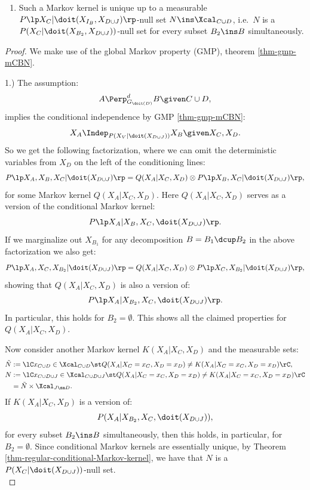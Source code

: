 \begin{Prp}
\begin{enumerate}
            that is a version of:  
            \[ P\lp X_A|\doit(X_{B_2}),X_C,\doit(X_{D\cup J})\rp\]
            for every subset $B_2 \ins B$ simultaneously. 
            Note that this Markov kernel is only dependent on $x_C$ and $x_D$, and constant in $x_{J \sm D}$.
        \item[] Such a Markov kernel is unique up to a measurable $P\lp X_C|\doit(X_{I_B},X_{D\cup J})\rp$-null set $N \ins \Xcal_{C\cup D}$, i.e.\ $N$ is a $P(X_C|\doit(X_{B_2},X_{D\cup J}))$-null set for every subset $B_2 \ins B$ simultaneously.
    \end{enumerate}
\begin{proof}
    We make use of the global Markov property (GMP), theorem \ref{thm-gmp-mCBN}.

1.) The assumption:
            \[ A \Perp^d_{G_{\doit(D)}} B \given C \cup D,   \]
implies the conditional independence by GMP \ref{thm-gmp-mCBN}:
  \[ X_A \Indep_{P(X_V|\doit(X_{D\cup J}))} X_B \given X_C,X_D.\]
So  we get the following factorization, where we can omit the deterministic variables from $X_D$ on the left of the conditioning lines:
  \[ P\lp X_A,X_B,X_C|\doit(X_{D\cup J})\rp = Q(X_A|X_C,X_D) \otimes P\lp X_B,X_C|\doit(X_{D\cup J})\rp,\]
for some Markov kernel $Q(X_A|X_C,X_D)$. Here
$Q(X_A|X_C,X_D)$ serves as a version of the conditional Markov kernel:
  \[P\lp X_A|X_B,X_C,\doit(X_{D\cup J})\rp.\]
If we marginalize out $X_{B_1}$ for any decomposition $B=B_1 \dcup B_2$ 
in the above factorization we also get:
  \[ P\lp X_A,X_C,X_{B_2}|\doit(X_{D\cup J})\rp = Q(X_A|X_C,X_D) \otimes P\lp X_C,X_{B_2}|\doit(X_{D\cup J})\rp,\]
showing that $Q(X_A|X_C,X_D)$ is also a version of:
  \[P\lp X_A|X_{B_2},X_C,\doit(X_{D\cup J})\rp.\]
In particular, this holds for $B_2 = \emptyset$. This shows all the claimed properties for $Q(X_A|X_C,X_D)$.

Now consider another Markov kernel $K(X_A|X_C,X_D)$ and the measurable sets:
\begin{align*}
    \tilde N &:= \lC x_{C \cup D} \in \Xcal_{C \cup D} \st Q(X_A|X_C=x_C,X_D=x_D) \neq K(X_A|X_C=x_C,X_D=x_D)  \rC,\\
     N &:= \lC x_{C \cup D \cup J} \in \Xcal_{C \cup D \cup J} \st Q(X_A|X_C=x_C,X_D=x_D) \neq K(X_A|X_C=x_C,X_D=x_D)  \rC \\
       &= \tilde N \times \Xcal_{J \sm D}.
\end{align*}
If $K(X_A|X_C,X_D)$ is a version of: 
\[P(X_A|X_{B_2},X_C,\doit(X_{D\cup J})),\] 
for every subset $B_2 \ins B$ simultaneously, then this holds, in particular, for $B_2 = \emptyset$.
Since conditional Markov kernels are essentially unique, by Theorem \ref{thm-regular-conditional-Markov-kernel}, we have that $N$ is a $P(X_C|\doit(X_{D\cup J}))$-null set.
\\


\end{proof}
\end{Prp}
